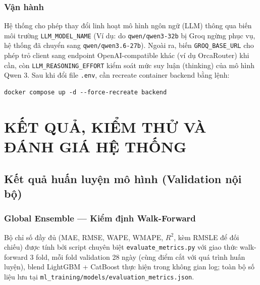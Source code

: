 \documentclass[12pt,a4paper]{report}
\begin{document}
\subsection{Vận hành}
Hệ thống cho phép thay đổi linh hoạt mô hình ngôn ngữ (LLM) thông qua biến môi trường \texttt{LLM\_MODEL\_NAME} (Ví dụ: do \texttt{qwen/qwen3-32b} bị Groq ngừng phục vụ, hệ thống đã chuyển sang \texttt{qwen/qwen3.6-27b}). Ngoài ra, biến \texttt{GROQ\_BASE\_URL} cho phép trỏ client sang endpoint OpenAI-compatible khác (ví dụ OrcaRouter) khi cần, còn \texttt{LLM\_REASONING\_EFFORT} kiểm soát mức suy luận (thinking) của mô hình Qwen 3. Sau khi đổi file \texttt{.env}, cần recreate container backend bằng lệnh:
\begin{verbatim}
docker compose up -d --force-recreate backend
\end{verbatim}
\cleardoublepage
\chapter{KẾT QUẢ, KIỂM THỬ VÀ ĐÁNH GIÁ HỆ THỐNG}

\section{Kết quả huấn luyện mô hình (Validation nội bộ)}

\subsection{Global Ensemble --- Kiểm định Walk-Forward}

Bộ chỉ số đầy đủ (MAE, RMSE, WAPE, WMAPE, $R^2$, kèm RMSLE để đối chiếu) được tính bởi
script chuyên biệt \texttt{evaluate\_metrics.py} với giao thức walk-forward 3 fold, mỗi
fold validation 28 ngày (cùng điểm cắt với quá trình huấn luyện), blend LightGBM +
CatBoost thực hiện trong không gian log; toàn bộ số liệu lưu tại
\texttt{ml\_training/models/evaluation\_metrics.json}.
\end{document}

